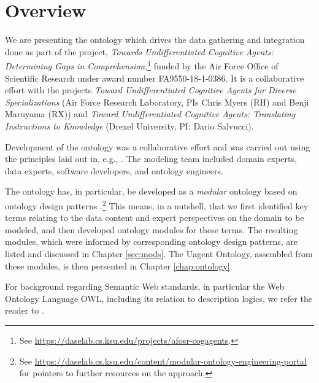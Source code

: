 \chapter{Overview}

We are presenting the ontology which drives the data gathering and integration done as part of the project, \emph{Towards Undifferentiated Cognitive Agents: Determining Gaps in Comprehension},\footnote{See \url{https://daselab.cs.ksu.edu/projects/afosr-cogagents}.} funded by the Air Force Office of Scientific Research under award number FA9550-18-1-0386. It is a collaborative effort with the projects \emph{Toward Undifferentiated Cognitive Agents for Diverse Specializations} (Air Force Research Laboratory, PIs Chris Myers (RH) and Benji Maruyama (RX)) and \emph{Toward Undifferentiated Cognitive Agents: Translating Instructions to Knowledge} (Drexel University, PI: Dario Salvucci).


Development of the ontology was a collaborative effort and was carried out using the principles laid out in, e.g., \cite{moe-chap}. The modeling team included domain experts, data experts, software developers, and ontology engineers. 

The ontology has, in particular, be developed as a \emph{modular} ontology \cite{moe-chap,HitzlerS18} based on ontology design patterns \cite{HGJKP2016}.\footnote{See \url{https://daselab.cs.ksu.edu/content/modular-ontology-engineering-portal} for pointers to further resources on the approach.} This means, in a nutshell, that we first identified key terms relating to the data content and expert perspectives on the domain to be modeled, and then developed ontology modules for these terms. The resulting modules, which were informed by corresponding ontology design patterns, are listed and discussed in Chapter \ref{sec:mods}. The Uagent Ontology, assembled from these modules, is then persented in Chapter \ref{chap:ontology}.

For background regarding Semantic Web standards, in particular the Web Ontology Language OWL, including its relation to description logics, we refer the reader to \cite{owl2-primer, FOST}.


